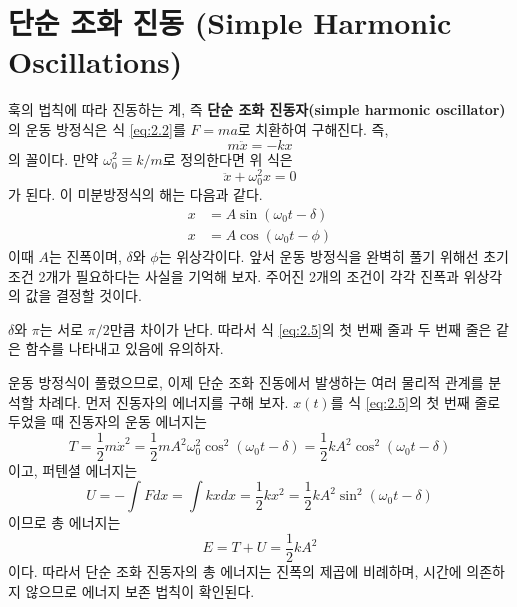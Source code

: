 \documentclass[chapter, oneside, b5paper]{oblivoir}
\theoremstyle{plain}
\theoremstyle{definition}
\theoremstyle{remark}
\begin{document}
\section{단순 조화 진동 (Simple Harmonic Oscillations)}
훅의 법칙에 따라 진동하는 계, 즉 \textbf{단순 조화 진동자(simple harmonic oscillator)}의 운동 방정식은 식 \ref{eq:2.2}를 $F=ma$로 치환하여 구해진다. 즉,
\begin{equation}
    m\ddot{x} = -kx \label{eq:2.3}
\end{equation}
의 꼴이다. 만약 $\omega^2_0 \equiv k/m$로 정의한다면 위 식은
\begin{equation}
    \ddot{x} + \omega^2_0x = 0 \label{eq:2.4}
\end{equation}
가 된다. 이 미분방정식의 해는 다음과 같다.
\begin{equation}
\begin{aligned}
    x &= A\sin{(\omega_0t-\delta)} \\
    x &= A\cos{(\omega_0t-\phi)} \label{eq:2.5}
\end{aligned}
\end{equation}
이때 $A$는 진폭이며, $\delta$와 $\phi$는 위상각이다. 앞서 운동 방정식을 완벽히 풀기 위해선 초기 조건 2개가 필요하다는 사실을 기억해 보자. 주어진 2개의 조건이 각각 진폭과 위상각의 값을 결정할 것이다.

$\delta$와 $\pi$는 서로 $\pi/2$만큼 차이가 난다. 따라서 식 \ref{eq:2.5}의 첫 번째 줄과 두 번째 줄은 같은 함수를 나타내고 있음에 유의하자.

운동 방정식이 풀렸으므로, 이제 단순 조화 진동에서 발생하는 여러 물리적 관계를 분석할 차례다. 먼저 진동자의 에너지를 구해 보자. $x(t)$를 식 \ref{eq:2.5}의 첫 번째 줄로 두었을 때 진동자의 운동 에너지는
\begin{equation}
    T = \frac{1}{2}m\dot{x}^2 = \frac{1}{2}mA^2\omega_0^2\cos^2{(\omega_0t-\delta)}=\frac{1}{2}kA^2\cos^2{(\omega_0t-\delta)}\label{eq:2.6}
\end{equation}
이고, 퍼텐셜 에너지는
\begin{equation}
    U = -\int Fdx = \int kxdx = \frac{1}{2}kx^2 = \frac{1}{2}kA^2\sin^2{(\omega_0t-\delta)} \label{eq:2.7}
\end{equation}
이므로 총 에너지는
\begin{equation}
    E = T + U = \frac{1}{2}kA^2 \label{eq:2.8}
\end{equation}
이다. 따라서 단순 조화 진동자의 총 에너지는 진폭의 제곱에 비례하며, 시간에 의존하지 않으므로 에너지 보존 법칙이 확인된다.
\end{document}
